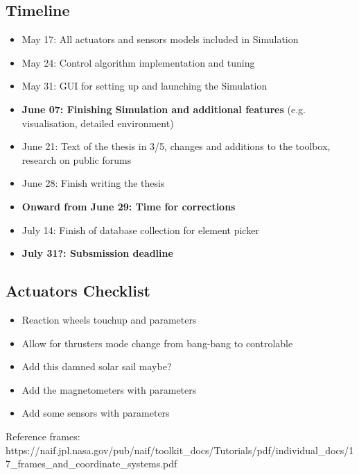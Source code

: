 \subsection*{Timeline}
\begin{itemize}
    \item May 17: All actuators and sensors models included in Simulation
    \item May 24: Control algorithm implementation and tuning
    \item May 31: GUI for setting up and launching the Simulation
    \item \textbf{June 07: Finishing Simulation and additional features} (e.g. visualisation, detailed environment)
    \item June 21: Text of the thesis in 3/5, changes and additions to the toolbox, research on public forums
    \item June 28: Finish writing the thesis
    \item \textbf{Onward from June 29: Time for corrections}
    \item July 14: Finish of database collection for element picker
    \item \textbf{July 31?: Subsmission deadline}
\end{itemize}


\subsection*{Actuators Checklist}
\begin{itemize}
    \item Reaction wheels touchup and parameters
    \item Allow for thrusters mode change from bang-bang to controlable
    \item Add this damned solar sail maybe?
    \item Add the magnetometers with parameters
    \item Add some sensors with parameters
\end{itemize}

Reference frames:
https://naif.jpl.nasa.gov/pub/naif/toolkit_docs/Tutorials/pdf/individual_docs/17_frames_and_coordinate_systems.pdf

